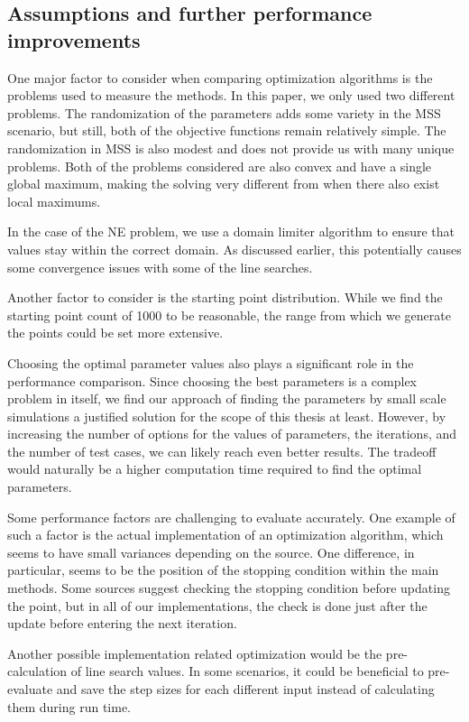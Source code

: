 \documentclass[english, 12pt, a4paper, sci, utf8, a-1b, online, table]{aaltothesis}
\begin{document}
\subsection{Assumptions and further performance improvements}

One major factor to consider when comparing optimization algorithms is the problems used to measure the methods. In this paper, we only used two different problems. The randomization of the parameters adds some variety in the MSS scenario, but still, both of the objective functions remain relatively simple. The randomization in MSS is also modest and does not provide us with many unique problems. Both of the problems considered are also convex and have a single global maximum, making the solving very different from when there also exist local maximums.

In the case of the NE problem, we use a domain limiter algorithm to ensure that values stay within the correct domain. As discussed earlier, this potentially causes some convergence issues with some of the line searches. 

Another factor to consider is the starting point distribution. While we find the starting point count of 1000 to be reasonable, the range from which we generate the points could be set more extensive.

Choosing the optimal parameter values also plays a significant role in the performance comparison. Since choosing the best parameters is a complex problem in itself, we find our approach of finding the parameters by small scale simulations a justified solution for the scope of this thesis at least. However, by increasing the number of options for the values of parameters, the iterations, and the number of test cases, we can likely reach even better results. The tradeoff would naturally be a higher computation time required to find the optimal parameters.

Some performance factors are challenging to evaluate accurately. One example of such a factor is the actual implementation of an optimization algorithm, which seems to have small variances depending on the source. One difference, in particular, seems to be the position of the stopping condition within the main methods. Some sources suggest checking the stopping condition before updating the point, but in all of our implementations, the check is done just after the update before entering the next iteration. \cite{book:convex_optimization} \cite{book:nonlinear_programming}

Another possible implementation related optimization would be the pre-calculation of line search values. In some scenarios, it could be beneficial to pre-evaluate and save the step sizes for each different input instead of calculating them during run time. \cite{book:convex_optimization}
\end{document}
